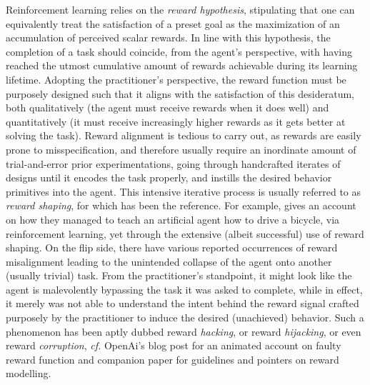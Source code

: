 Reinforcement learning relies on the \emph{reward hypothesis},
stipulating that one can equivalently treat the satisfaction of a preset goal
as the maximization of an accumulation of perceived scalar rewards.
In line with this hypothesis, the completion of a task should coincide, from the agent's perspective,
with having reached the utmost cumulative amount of rewards achievable during its learning lifetime.
Adopting the practitioner's perspective,
the reward function must be purposely designed such that it aligns with the satisfaction of this desideratum,
both qualitatively (the agent must receive rewards when it does well)
and quantitatively (it must receive increasingly higher rewards as it gets better at solving the task).
Reward alignment is tedious to carry out, as rewards are easily prone to misspecification,
and therefore usually require an inordinate amount of trial-and-error prior experimentations,
going through handcrafted iterates of designs until it encodes the task properly, and instills the desired
behavior primitives into the agent.
This intensive iterative process is usually referred to as \textit{reward shaping},
for which \cite{Ng1999-lv} has been the reference.
For example, \cite{Randlov1998-qo} gives an account on how they managed to teach
an artificial agent how to drive a bicycle,
via reinforcement learning, yet through the extensive (albeit successful) use of reward shaping.
On the flip side, there have various reported occurrences of reward misalignment leading to
the unintended collapse of the agent onto another (usually trivial) task.
From the practitioner's standpoint, it might look like the agent is malevolently bypassing the task
it was asked to complete, while in effect, it merely was not able to understand the intent behind the
reward signal crafted purposely by the practitioner to induce the desired (unachieved) behavior.
Such a phenomenon has been aptly dubbed reward \textit{hacking}, or reward \textit{hijacking}, or
even reward \textit{corruption}, \textit{cf.} OpenAi's blog post \cite{Amodei2016-vg}
for an animated account on faulty reward function and companion paper \cite{Amodei2016-tb} for
guidelines and pointers on reward modelling.

